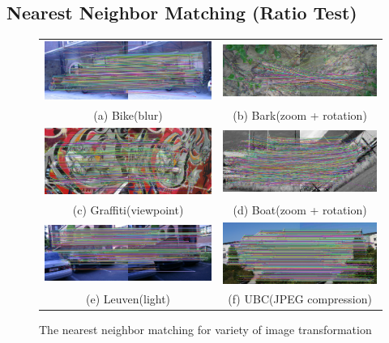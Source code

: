 \subsection {Nearest Neighbor Matching (Ratio Test)}
\begin{figure}[H]
\begin{tabular}{cc}
  \includegraphics[width=75mm]{figures/bike_nn_1_3} &  \includegraphics[width=75mm]{figures/barks_nn_1_3} \\
(a) Bike(blur) & (b) Bark(zoom + rotation) \\[6pt]
 \includegraphics[width=75mm]{figures/graffiti_nn_1_3} &  \includegraphics[width=75mm]{figures/boat_nn_1_3} \\
(c) Graffiti(viewpoint) & (d) Boat(zoom + rotation) \\[6pt]
 \includegraphics[width=75mm]{figures/leuven_nn_1_3} &  \includegraphics[width=75mm]{figures/ubc_nn_1_3} \\
(e) Leuven(light) & (f) UBC(JPEG compression) \\[6pt]
\end{tabular}
\caption{The nearest neighbor matching for variety of image transformation}\label{fig:nearest_neighbor_matching}
\end{figure}

